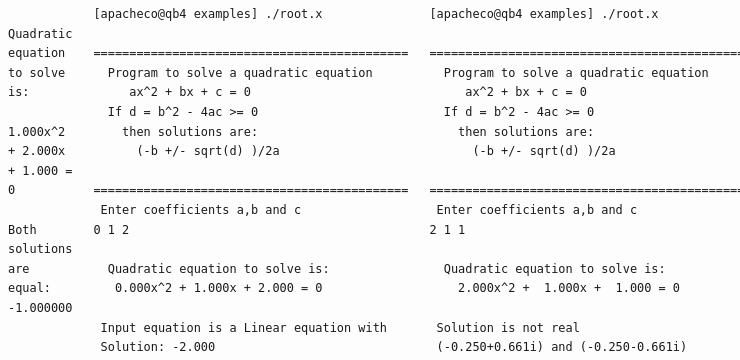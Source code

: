 \documentclass[slidestop,mathserif,compress,xcolor=svgnames]{beamer}
\newenvironment{beblock}[0]
{
\begin{beamerboxesrounded}[upper=uppercol3,lower=lowercol3,shadow=true]}
{\end{beamerboxesrounded}}
\begin{document}
\begin{frame}
{\begin{columns}
\begin{beblock}{}
\begin{verbatim}
  Quadratic equation to solve is: 
   1.000x^2 + 2.000x + 1.000 = 0

Both solutions are equal:    -1.000000
        \end{verbatim}
      \end{beblock}
      \column{3.7cm}
      \begin{beblock}{}
        \begin{verbatim}
[apacheco@qb4 examples] ./root.x 
 ============================================
  Program to solve a quadratic equation
     ax^2 + bx + c = 0 
  If d = b^2 - 4ac >= 0 
    then solutions are: 
      (-b +/- sqrt(d) )/2a 
 ============================================
 Enter coefficients a,b and c
0 1 2

  Quadratic equation to solve is: 
   0.000x^2 + 1.000x + 2.000 = 0

 Input equation is a Linear equation with 
 Solution: -2.000
        \end{verbatim}
      \end{beblock}
      \column{3.7cm}
      \begin{beblock}{}
        \begin{verbatim}
[apacheco@qb4 examples] ./root.x 
 ============================================
  Program to solve a quadratic equation
     ax^2 + bx + c = 0 
  If d = b^2 - 4ac >= 0 
    then solutions are: 
      (-b +/- sqrt(d) )/2a 
 ============================================
 Enter coefficients a,b and c
2 1 1

  Quadratic equation to solve is: 
    2.000x^2 +  1.000x +  1.000 = 0

 Solution is not real
 (-0.250+0.661i) and (-0.250-0.661i)
        \end{verbatim}
      \end{beblock}
    \end{columns}
  }
\end{frame}
\end{document}
